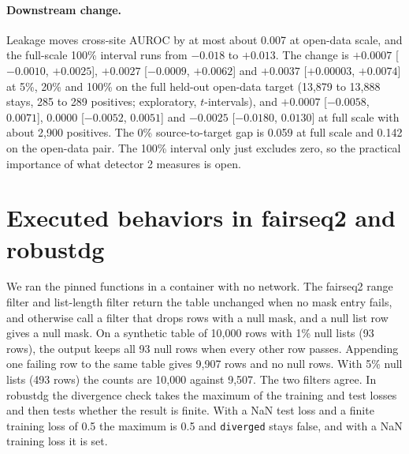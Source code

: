 \documentclass[10pt]{article}
\theoremstyle{definition}
\begin{document}
\paragraph{Downstream change.} Leakage moves cross-site AUROC by at most about 0.007 at open-data scale, and the full-scale 100\% interval runs from $-0.018$ to $+0.013$. The change is $+0.0007$ [$-0.0010$, $+0.0025$], $+0.0027$ [$-0.0009$, $+0.0062$] and $+0.0037$ [$+0.00003$, $+0.0074$] at 5\%, 20\% and 100\% on the full held-out open-data target (13,879 to 13,888 stays, 285 to 289 positives; exploratory, $t$-intervals), and $+0.0007$ [$-0.0058$, $0.0071$], $0.0000$ [$-0.0052$, $0.0051$] and $-0.0025$ [$-0.0180$, $0.0130$] at full scale with about 2,900 positives. The 0\% source-to-target gap is 0.059 at full scale and 0.142 on the open-data pair. The 100\% interval only just excludes zero, so the practical importance of what detector 2 measures is open.

\section{Executed behaviors in fairseq2 and robustdg}
\label{apd:d2detail}
We ran the pinned functions in a container with no network. The fairseq2 range filter and list-length filter return the table unchanged when no mask entry fails, and otherwise call a filter that drops rows with a null mask, and a null list row gives a null mask. On a synthetic table of 10,000 rows with 1\% null lists (93 rows), the output keeps all 93 null rows when every other row passes. Appending one failing row to the same table gives 9,907 rows and no null rows. With 5\% null lists (493 rows) the counts are 10,000 against 9,507. The two filters agree. In robustdg the divergence check takes the maximum of the training and test losses and then tests whether the result is finite. With a NaN test loss and a finite training loss of 0.5 the maximum is 0.5 and \texttt{diverged} stays false, and with a NaN training loss it is set.
\end{document}
